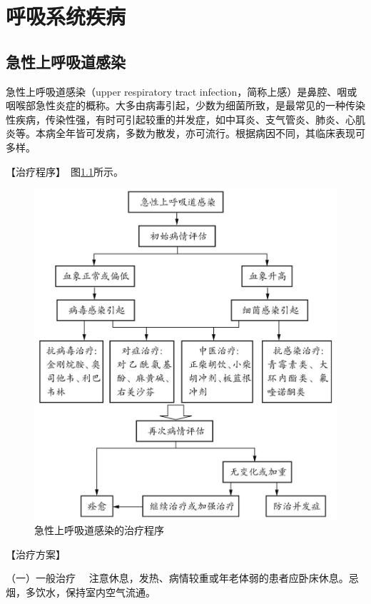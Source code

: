 \chapter{呼吸系统疾病}

\section{急性上呼吸道感染}

急性上呼吸道感染（upper respiratory tract
infection，简称上感）是鼻腔、咽或咽喉部急性炎症的概称。大多由病毒引起，少数为细菌所致，是最常见的一种传染性疾病，传染性强，有时可引起较重的并发症，如中耳炎、支气管炎、肺炎、心肌炎等。本病全年皆可发病，多数为散发，亦可流行。根据病因不同，其临床表现可多样。

【治疗程序】　图\ref{fig1-1-1}所示。

\begin{figure}[!htbp]
 \centering
 \includegraphics{./images/Image00000.jpg}
 \captionsetup{justification=centering}
 \caption{急性上呼吸道感染的治疗程序}
 \label{fig1-1-1}
  \end{figure} 

【治疗方案】

{（一）一般治疗}
　注意休息，发热、病情较重或年老体弱的患者应卧床休息。忌烟，多饮水，保持室内空气流通。

